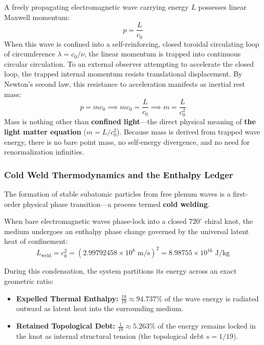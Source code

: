 \documentclass[11pt,a4paper]{article}
\begin{document}
A freely propagating electromagnetic wave carrying energy $L$ possesses linear Maxwell momentum:
\begin{equation}
p = \frac{L}{c_0}
\end{equation}
When this wave is confined into a self-reinforcing, closed toroidal circulating loop of circumference $\lambda = c_0 / \nu$, the linear momentum is trapped into continuous circular circulation. To an external observer attempting to accelerate the closed loop, the trapped internal momentum resists translational displacement. By Newton's second law, this resistance to acceleration manifests as inertial rest mass:
\begin{equation}
p = m c_0 \implies m c_0 = \frac{L}{c_0} \implies m = \frac{L}{c_0^2}
\label{eq:mass_as_trapped_light}
\end{equation}
Mass is nothing other than \textbf{confined light}---the direct physical meaning of \textbf{the light matter equation} ($m = L/c_0^2$). Because mass is derived from trapped wave energy, there is no bare point mass, no self-energy divergence, and no need for renormalization infinities.

\subsubsection{Cold Weld Thermodynamics and the Enthalpy Ledger}

The formation of stable subatomic particles from free plenum waves is a first-order physical phase transition---a process termed \textbf{cold welding}.

When bare electromagnetic waves phase-lock into a closed $720^\circ$ chiral knot, the medium undergoes an enthalpy phase change governed by the universal latent heat of confinement:
\begin{equation}
L_{\text{weld}} = c_0^2 = (2.99792458 \times 10^8\text{ m/s})^2 = 8.98755 \times 10^{16}\text{ J/kg}
\label{eq:latent_heat_weld}
\end{equation}

During this condensation, the system partitions its energy across an exact geometric ratio:
\begin{itemize}
    \item \textbf{Expelled Thermal Enthalpy:} $\frac{18}{19} \approx 94.737\%$ of the wave energy is radiated outward as latent heat into the surrounding medium.
    \item \textbf{Retained Topological Debt:} $\frac{1}{19} \approx 5.263\%$ of the energy remains locked in the knot as internal structural tension (the topological debt $s = 1/19$).
\end{itemize}
\end{document}
